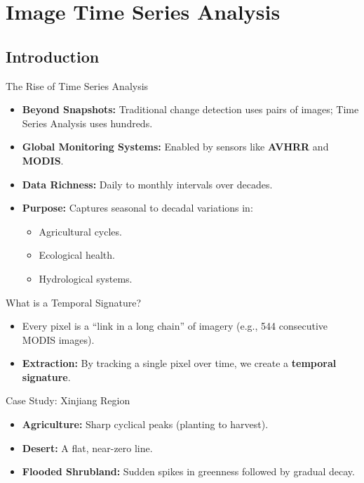 \documentclass[aspectratio=169]{beamer}
\begin{document}
\section{Image Time Series Analysis}

\subsection{Introduction}

\begin{frame}{The Rise of Time Series Analysis}
    \begin{itemize}
        \item \textbf{Beyond Snapshots:} Traditional change detection uses pairs of images; Time Series Analysis uses hundreds.
        \item \textbf{Global Monitoring Systems:} Enabled by sensors like \textbf{AVHRR} and \textbf{MODIS}.
        \item \textbf{Data Richness:} Daily to monthly intervals over decades.
        \item \textbf{Purpose:} Captures seasonal to decadal variations in:
        \begin{itemize}
            \item Agricultural cycles.
            \item Ecological health.
            \item Hydrological systems.
        \end{itemize}
    \end{itemize}
\end{frame}

\begin{frame}{What is a Temporal Signature?}
    \begin{itemize}
        \item Every pixel is a ``link in a long chain'' of imagery (e.g., 544 consecutive MODIS images).
        \item \textbf{Extraction:} By tracking a single pixel over time, we create a \textbf{temporal signature}.
    \end{itemize}
    \vspace{0.5cm}
    \begin{block}{Case Study: Xinjiang Region}
        \begin{itemize}
            \item \textbf{Agriculture:} Sharp cyclical peaks (planting to harvest).
            \item \textbf{Desert:} A flat, near-zero line.
            \item \textbf{Flooded Shrubland:} Sudden spikes in greenness followed by gradual decay.
        \end{itemize}
    \end{block}
\end{frame}
\end{document}
